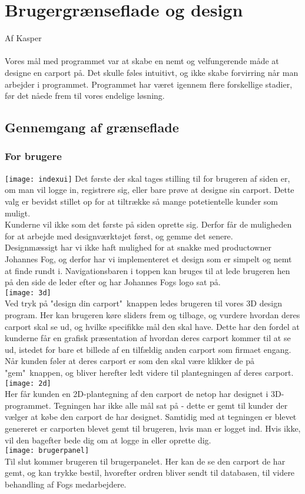 \section{Brugergrænseflade og design}
Af Kasper\\\\
Vores mål med programmet var at skabe en nemt og velfungerende måde at designe en carport på. Det skulle føles intuitivt, og ikke skabe forvirring når man arbejder i programmet. Programmet har været igennem flere forskellige stadier, før det nåede frem til vores endelige løsning.
\\
\subsection{Gennemgang af grænseflade}
\subsubsection{For brugere}
\texttt{[image: indexui]}
Det første der skal tages stilling til for brugeren af siden er, om man vil logge in, registrere sig, eller bare prøve at designe sin carport. Dette valg er bevidst stillet op for at tiltrække så mange potetientelle kunder som muligt.\\
Kunderne vil ikke som det første på siden oprette sig. Derfor får de muligheden for at arbejde med designværktøjet først, og gemme det senere.\\
Designmæssigt har vi ikke haft mulighed for at snakke med productowner Johannes Fog, og derfor har vi implementeret et design som er simpelt og nemt at finde rundt i.
Navigationsbaren i toppen kan bruges til at lede brugeren hen på den side de leder efter og har Johannes Fogs logo sat på.\\
\texttt{[image: 3d]}\\
Ved tryk på "design din carport"\ knappen ledes brugeren til vores 3D design program. Her kan brugeren køre sliders frem og tilbage, og vurdere hvordan deres carport skal se ud, og hvilke specifikke mål den skal have. Dette har den fordel at kunderne får en grafisk præsentation af hvordan deres carport kommer til at se ud, istedet for bare et billede af en tilfældig anden carport som firmaet engang. Når kunden føler at deres carport er som den skal være klikker de på "gem"\ knappen, og bliver herefter ledt videre til plantegningen af deres carport.\\
\texttt{[image: 2d]}\\
Her får kunden en 2D-plantegning af den carport de netop har designet i 3D-programmet. Tegningen har ikke alle mål sat på - dette er gemt til kunder der vælger at købe den carport de har designet. Samtidig med at tegningen er blevet genereret er carporten blevet gemt til brugeren, hvis man er logget ind. Hvis ikke, vil den bagefter bede dig om at logge in eller oprette dig.\\
\texttt{[image: brugerpanel]}\\
Til slut kommer brugeren til brugerpanelet. Her kan de se den carport de har gemt, og kan trykke bestil, hvorefter ordren bliver sendt til databasen, til videre behandling af Fogs medarbejdere. \\
